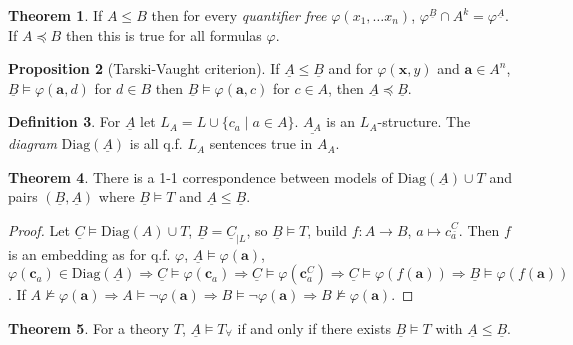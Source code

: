 \documentclass[a4paper,10pt]{article}
\theoremstyle{definition}
\newtheorem{theorem}{Theorem}
\newtheorem{definition}[theorem]{Definition}
\newtheorem{proposition}[theorem]{Proposition}
\let\vec\mathbf
\let\phi\varphi
\let\preceq\preccurlyeq
\let\leq\leqslant
\let\implies\Rightarrow
\begin{document}
\begin{theorem}
    If $A \leqslant B$ then for every \emph{quantifier free} $\varphi(x_1, \ldots x_n)$, $\varphi ^ {\underline{B}} \cap A^k = \varphi ^ {\underline{A}}$.
    If $A \preceq B$ then this is true for all formulas $\varphi$.
\end{theorem}

\begin{proposition}[Tarski-Vaught criterion]
    If $\underline{A} \leqslant \underline{B}$ and for $\phi(\vec{x}, y )$ and $\vec{a} \in A^n$, $\underline{B} \models \phi(\vec{a}, d)$ for $d \in B$ then $\underline{B} \models \phi(\vec{a}, c)$ for $c \in A$, then $\underline{A} \preceq \underline{B}$.
\end{proposition}

\begin{definition}
    For $\underline{A}$ let $L_A = L \cup \{c_a \mid a \in A\}$. $\underline{A_A}$ is an $L_A$-structure. The \emph{diagram} $\mathrm{Diag}(\underline{A})$ is all q.f. $L_A$ sentences true in $A_A$.
\end{definition}

\begin{theorem}
    There is a 1-1 correspondence between models of $\mathrm{Diag}(\underline{A}) \cup T$ and pairs $(\underline{B}, \underline{A})$ where $\underline{B} \models T$ and $\underline{A} \leq \underline{B}$.
\end{theorem}

\begin{proof}
    Let $\underline{C} \models \mathrm{Diag}(A) \cup T$, $\underline{B} = \underline{C}_{\mid L}$, so $\underline{B} \models T$, build $f \colon A \rightarrow B$, $a \mapsto c_a^{\underline{C}}$. Then $f$ is an embedding as for q.f. $\phi$, $\underline{A} \models \phi(\vec{a})$, $\phi(\vec{c}_a) \in \mathrm{Diag}(\underline{A}) \implies \underline{C} \models  \phi(\vec{c}_a) \implies \underline{C} \models \phi(\vec{c}_a^C) \implies \underline{C} \models \phi(f(\vec{a})) \implies \underline{B} \models \phi(f(\vec{a}))$. If $A \nvDash \phi(\vec{a}) \implies A \models \neg \phi(\vec{a}) \implies B \models \neg \phi(\vec{a}) \implies B \nvDash \phi(\vec{a})$.
\end{proof}



\begin{theorem}
    For a theory $T$, $\underline{A} \models T_{\forall}$ if and only if there exists $\underline{B} \models T$ with $\underline{A}  \leqslant \underline{B}$. 
\end{theorem}
\end{document}
